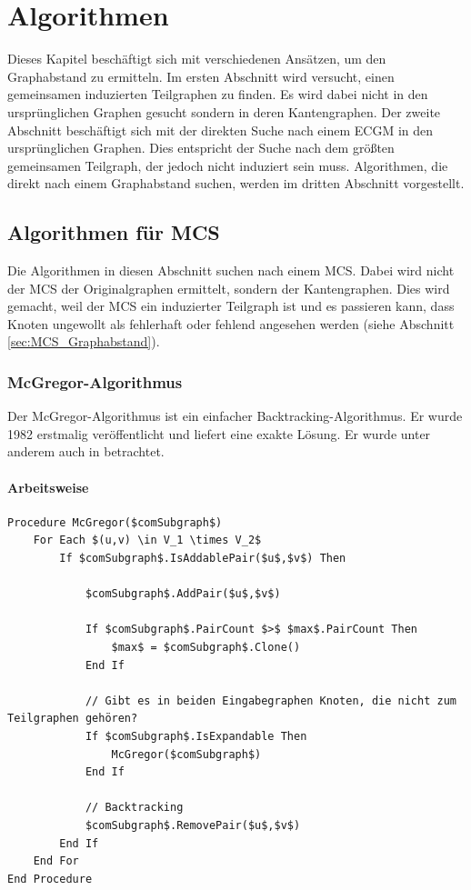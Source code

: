 \chapter{Algorithmen}

Dieses Kapitel beschäftigt sich mit verschiedenen Ansätzen, um den 
Graphabstand zu ermitteln. Im ersten Abschnitt wird versucht, einen 
gemeinsamen induzierten Teilgraphen zu finden. Es wird dabei nicht 
in den ursprünglichen Graphen gesucht sondern in deren Kantengraphen. 
Der zweite Abschnitt beschäftigt sich mit der direkten Suche nach 
einem ECGM in den ursprünglichen Graphen. Dies entspricht der Suche 
nach dem größten gemeinsamen Teilgraph, der jedoch nicht induziert 
sein muss. Algorithmen, die direkt nach einem Graphabstand suchen, 
werden im dritten Abschnitt vorgestellt. 

\section{Algorithmen für MCS}

Die Algorithmen in diesen Abschnitt suchen nach einem MCS. Dabei 
wird nicht der MCS der Originalgraphen ermittelt, sondern der 
Kantengraphen. Dies wird gemacht, weil der MCS ein induzierter 
Teilgraph ist und es passieren kann, dass Knoten ungewollt als 
fehlerhaft oder fehlend angesehen werden (siehe Abschnitt \ref{sec:MCS_Graphabstand}). 

\subsection{McGregor-Algorithmus}\label{sec:McGregor}
Der McGregor-Algorithmus ist ein einfacher Backtracking-Algorithmus. 
Er wurde 1982 erstmalig veröffentlicht und liefert eine exakte 
Lösung. Er wurde unter anderem auch in \cite{MaxCGAlgComp} 
betrachtet. 

\subsubsection{Arbeitsweise}
\begin{lstlisting}[float=htb, caption={McGregor-Algorithmus},label={lst:McGregor}]
Procedure McGregor($comSubgraph$)
    For Each $(u,v) \in V_1 \times V_2$
        If $comSubgraph$.IsAddablePair($u$,$v$) Then

            $comSubgraph$.AddPair($u$,$v$)
        
            If $comSubgraph$.PairCount $>$ $max$.PairCount Then
                $max$ = $comSubgraph$.Clone()
            End If
            
            // Gibt es in beiden Eingabegraphen Knoten, die nicht zum Teilgraphen gehören?
            If $comSubgraph$.IsExpandable Then
                McGregor($comSubgraph$)
            End If
            
            // Backtracking
            $comSubgraph$.RemovePair($u$,$v$)
        End If
    End For
End Procedure
\end{lstlisting}

